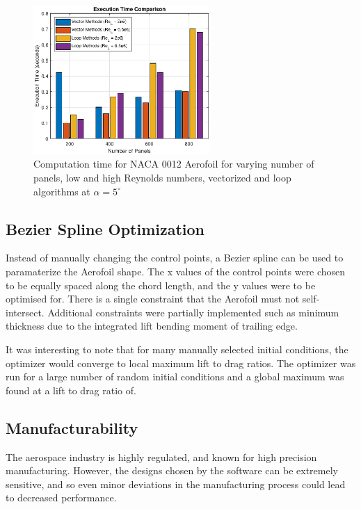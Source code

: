 \documentclass{article}
\begin{document}
\begin{figure}[H]
    \centering
    \includegraphics[width=0.6\textwidth]{figures/RePanelVec_times.eps}
    \caption{Computation time for NACA 0012 Aerofoil for varying number of panels, low and high Reynolds numbers, vectorized and loop algorithms at $\alpha = 5^\circ$}
    \label{fig:RePanelVec_times}
\end{figure}

\subsection{Bezier Spline Optimization}

Instead of manually changing the control points, a Bezier spline can be used to paramaterize the Aerofoil shape.
The x values of the control points were chosen to be equally spaced along the chord length, and the y values were to be optimised for.
There is a single constraint that the Aerofoil must not self-intersect.
Additional constraints were partially implemented such as minimum thickness due to the integrated lift bending moment of trailing edge.

It was interesting to note that for many manually selected initial conditions, the optimizer would converge to local maximum lift to drag ratios.
The optimizer was run for a large number of random initial conditions and a global maximum was found at a lift to drag ratio of.

\subsection{Manufacturability}

The aerospace industry is highly regulated, and known for high precision manufacturing.
However, the designs chosen by the software can be extremely sensitive, and so even minor deviations in the manufacturing process could lead to decreased performance.
\end{document}
